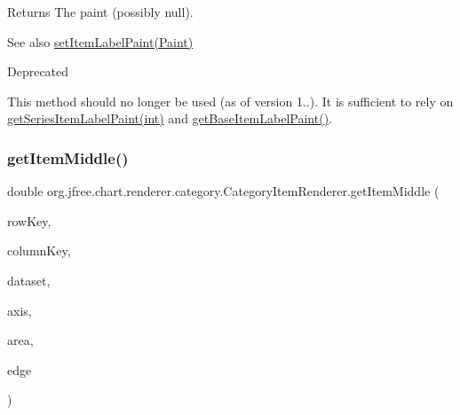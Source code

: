 \begin{DoxyReturn}{Returns}
The paint (possibly {\ttfamily null}).
\end{DoxyReturn}
\begin{DoxySeeAlso}{See also}
\mbox{\hyperlink{interfaceorg_1_1jfree_1_1chart_1_1renderer_1_1category_1_1_category_item_renderer_aac3a93a3b766677b28bcb79d233a498b}{set\+Item\+Label\+Paint(\+Paint)}}
\end{DoxySeeAlso}
\begin{DoxyRefDesc}{Deprecated}
\item[\mbox{\hyperlink{deprecated__deprecated000172}{Deprecated}}]This method should no longer be used (as of version 1..). It is sufficient to rely on \mbox{\hyperlink{interfaceorg_1_1jfree_1_1chart_1_1renderer_1_1category_1_1_category_item_renderer_a781dce45cf2ee87d6d891809ef826852}{get\+Series\+Item\+Label\+Paint(int)}} and \mbox{\hyperlink{interfaceorg_1_1jfree_1_1chart_1_1renderer_1_1category_1_1_category_item_renderer_a7235637c78c4be2e7cf0a2d46e03a034}{get\+Base\+Item\+Label\+Paint()}}. \end{DoxyRefDesc}
\mbox{\label{interfaceorg_1_1jfree_1_1chart_1_1renderer_1_1category_1_1_category_item_renderer_aa3893e60f96a542d2fefe6ae76e47964}} 
\subsubsection{\texorpdfstring{get\+Item\+Middle()}{getItemMiddle()}}
{\footnotesize\ttfamily double org.\+jfree.\+chart.\+renderer.\+category.\+Category\+Item\+Renderer.\+get\+Item\+Middle (\begin{DoxyParamCaption}\item[{Comparable}]{row\+Key,  }\item[{Comparable}]{column\+Key,  }\item[{\mbox{\hyperlink{interfaceorg_1_1jfree_1_1data_1_1category_1_1_category_dataset}{Category\+Dataset}}}]{dataset,  }\item[{\mbox{\hyperlink{classorg_1_1jfree_1_1chart_1_1axis_1_1_category_axis}{Category\+Axis}}}]{axis,  }\item[{Rectangle2D}]{area,  }\item[{Rectangle\+Edge}]{edge }\end{DoxyParamCaption})}

